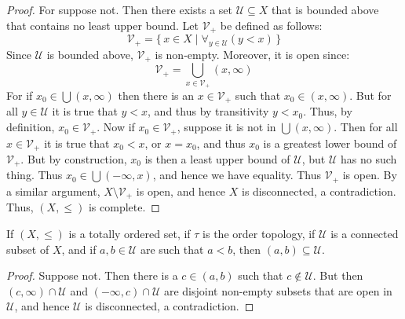 \documentclass{article}                                                        %
\begin{document}
        \begin{proof}
                For suppose not. Then there exists a set
                $\mathcal{U}\subseteq{X}$ that is bounded above that contains
                no least upper bound. Let $\mathcal{V}_{+}$ be defined as
                follows:
                \begin{equation}
                    \mathcal{V}_{+}=\{\,x\in{X}\;|\;
                        \forall_{y\in\mathcal{U}}(y<x)\,\}
                \end{equation}
                Since $\mathcal{U}$ is bounded above, $\mathcal{V}_{+}$ is
                non-empty. Moreover, it is open since:
                \begin{equation}
                    \mathcal{V}_{+}=
                    \bigcup_{x\in\mathcal{V}_{+}}(x,\infty)
                \end{equation}
                For if $x_{0}\in\bigcup(x,\infty)$ then there is an
                $x\in\mathcal{V}_{+}$ such that $x_{0}\in(x,\infty)$. But
                for all $y\in\mathcal{U}$ it is true that $y<x$, and thus by
                transitivity $y<x_{0}$. Thus, by definition,
                $x_{0}\in\mathcal{V}_{+}$. Now if $x_{0}\in\mathcal{V}_{+}$,
                suppose it is not in $\bigcup(x,\infty)$. Then for all
                $x\in\mathcal{V}_{+}$ it is true that $x_{0}<x$, or $x=x_{0}$,
                and thus $x_{0}$ is a greatest lower bound of $\mathcal{V}_{+}$.
                But by construction, $x_{0}$ is then a least upper bound of
                $\mathcal{U}$, but $\mathcal{U}$ has no such thing. Thus
                $x_{0}\in\bigcup(\minus\infty,x)$, and hence we have equality.
                Thus $\mathcal{V}_{+}$ is open. By a similar argument,
                ${X}\setminus\mathcal{V}_{+}$ is open, and hence $X$ is
                disconnected, a contradiction. Thus, $(X,\leq)$ is complete.
        \end{proof}
        \begin{theorem}
                If $(X,\leq)$ is a totally ordered set, if $\tau$ is the order
                topology, if $\mathcal{U}$ is a connected subset of $X$, and if
                $a,b\in\mathcal{U}$ are such that $a<b$, then
                $(a,b)\subseteq\mathcal{U}$.
        \end{theorem}
        \begin{proof}
                Suppose not. Then there is a $c\in(a,b)$ such that
                $c\notin\mathcal{U}$. But then $(c,\infty)\cap\mathcal{U}$ and
                $(\minus\infty,c)\cap\mathcal{U}$ are disjoint non-empty subsets
                that are open in $\mathcal{U}$, and hence $\mathcal{U}$ is
                disconnected, a contradiction.
        \end{proof}
\end{document}
